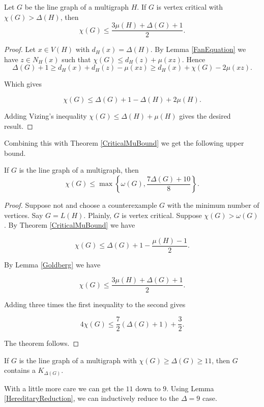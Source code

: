 \begin{lem}\label{Goldberg}
Let $G$ be the line graph of a multigraph $H$.  If $G$ is vertex critical with $\chi(G) > \Delta(H)$, then
\[\chi(G) \leq \frac{3\mu(H) + \Delta(G) + 1}{2}.\]
\end{lem}
\begin{proof}
Let $x \in V(H)$ with $d_H(x) = \Delta(H)$.  By Lemma \ref{FanEquation} we have $z \in N_H(x)$ such that $\chi(G) \leq d_H(z) + \mu(xz)$.  Hence
\[\Delta(G) + 1 \geq d_H(x) + d_H(z) - \mu(xz) \geq d_H(x) + \chi(G) - 2\mu(xz).\]

\noindent Which gives

\[\chi(G) \leq \Delta(G) + 1 - \Delta(H) + 2\mu(H).\]

\noindent Adding Vizing's inequality $\chi(G) \leq \Delta(H) + \mu(H)$ gives the desired result.
\end{proof}

\noindent Combining this with Theorem \ref{CriticalMuBound} we get the following upper bound.

\begin{thm}\label{TheoremL}
If $G$ is the line graph of a multigraph, then
\[\chi(G) \leq \max\left\{\omega(G), \frac{7\Delta(G) + 10}{8}\right\}.\]
\end{thm}
\begin{proof}
Suppose not and choose a counterexample $G$ with the minimum number of vertices.  Say $G = L(H)$. Plainly, $G$ is vertex critical.  Suppose $\chi(G) > \omega(G)$. By Theorem \ref{CriticalMuBound} we have

\[\chi(G) \leq \Delta(G) + 1 - \frac{\mu(H) - 1}{2}.\]

\noindent By Lemma \ref{Goldberg} we have

\[\chi(G) \leq \frac{3\mu(H) + \Delta(G) + 1}{2}.\]

\noindent Adding three times the first inequality to the second gives

\[4\chi(G) \leq \frac72(\Delta(G) + 1) + \frac32.\]

\noindent The theorem follows.
\end{proof}

\begin{cor}
If $G$ is the line graph of a multigraph with $\chi(G) \geq \Delta(G) \geq 11$, then $G$ contains a $K_{\Delta(G)}$.
\end{cor}

With a little more care we can get the $11$ down to $9$.  Using Lemma \ref{HereditaryReduction}, we can inductively reduce to the $\Delta = 9$ case.

